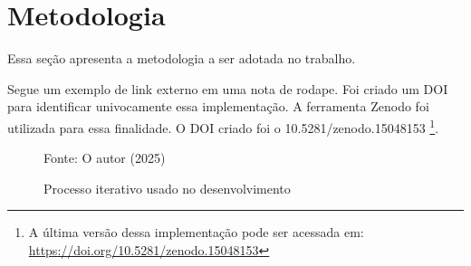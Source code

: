 \chapter{Metodologia}\label{cap:metodologia}

Essa seção apresenta a metodologia a ser adotada no trabalho.

Segue um exemplo de link externo em uma nota de rodape. Foi criado um DOI para identificar univocamente essa implementação. A ferramenta Zenodo foi utilizada para essa finalidade. O DOI criado foi o 10.5281/zenodo.15048153 \footnote{A última versão dessa implementação pode ser acessada em: \url{https://doi.org/10.5281/zenodo.15048153}}.

\lipsum[37-38]

\begin{figure}[ht]
    \centering
    \caption{Processo iterativo usado no desenvolvimento}
        {Fonte: O autor (2025)}
    \label{fig:metodologia}
\end{figure}

\lipsum[39-41]